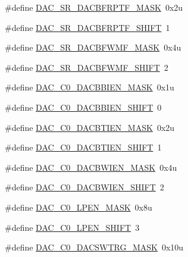 \begin{DoxyCompactItemize}
\#define \hyperlink{group___d_a_c___register___masks_ga662e824677c1a7a94ddd36e90f3d37d5}{D\+A\+C\+\_\+\+S\+R\+\_\+\+D\+A\+C\+B\+F\+R\+P\+T\+F\+\_\+\+M\+A\+SK}~0x2u
\item 
\#define \hyperlink{group___d_a_c___register___masks_gad1df4286616f5369388e865f5f821ae9}{D\+A\+C\+\_\+\+S\+R\+\_\+\+D\+A\+C\+B\+F\+R\+P\+T\+F\+\_\+\+S\+H\+I\+FT}~1
\item 
\#define \hyperlink{group___d_a_c___register___masks_ga612ec408d340d5011ff4326eda077ae3}{D\+A\+C\+\_\+\+S\+R\+\_\+\+D\+A\+C\+B\+F\+W\+M\+F\+\_\+\+M\+A\+SK}~0x4u
\item 
\#define \hyperlink{group___d_a_c___register___masks_ga01791b2f636fa97d33fa49d410ca8b44}{D\+A\+C\+\_\+\+S\+R\+\_\+\+D\+A\+C\+B\+F\+W\+M\+F\+\_\+\+S\+H\+I\+FT}~2
\item 
\#define \hyperlink{group___d_a_c___register___masks_gadc37ad99d42f4b9d0e26ce03f2ac79ad}{D\+A\+C\+\_\+\+C0\+\_\+\+D\+A\+C\+B\+B\+I\+E\+N\+\_\+\+M\+A\+SK}~0x1u
\item 
\#define \hyperlink{group___d_a_c___register___masks_ga956aa991114a1bb71a891e66d7092d1e}{D\+A\+C\+\_\+\+C0\+\_\+\+D\+A\+C\+B\+B\+I\+E\+N\+\_\+\+S\+H\+I\+FT}~0
\item 
\#define \hyperlink{group___d_a_c___register___masks_gad8a60a2fa6211ff08bba4b9648fb8daa}{D\+A\+C\+\_\+\+C0\+\_\+\+D\+A\+C\+B\+T\+I\+E\+N\+\_\+\+M\+A\+SK}~0x2u
\item 
\#define \hyperlink{group___d_a_c___register___masks_ga1f8eb9a96341365badba1280bed49e05}{D\+A\+C\+\_\+\+C0\+\_\+\+D\+A\+C\+B\+T\+I\+E\+N\+\_\+\+S\+H\+I\+FT}~1
\item 
\#define \hyperlink{group___d_a_c___register___masks_gaedff72359a12b93e4b61a57a0613d3cb}{D\+A\+C\+\_\+\+C0\+\_\+\+D\+A\+C\+B\+W\+I\+E\+N\+\_\+\+M\+A\+SK}~0x4u
\item 
\#define \hyperlink{group___d_a_c___register___masks_ga2b61f6fc85e9dc9d7c736055b47fadd1}{D\+A\+C\+\_\+\+C0\+\_\+\+D\+A\+C\+B\+W\+I\+E\+N\+\_\+\+S\+H\+I\+FT}~2
\item 
\#define \hyperlink{group___d_a_c___register___masks_ga54a04b9ae84c5a4f8977ae2e1a889717}{D\+A\+C\+\_\+\+C0\+\_\+\+L\+P\+E\+N\+\_\+\+M\+A\+SK}~0x8u
\item 
\#define \hyperlink{group___d_a_c___register___masks_ga97aaa812a3938df3559cb40b893db431}{D\+A\+C\+\_\+\+C0\+\_\+\+L\+P\+E\+N\+\_\+\+S\+H\+I\+FT}~3
\item 
\#define \hyperlink{group___d_a_c___register___masks_ga7e785d90fec3c1817fc53fea41f41644}{D\+A\+C\+\_\+\+C0\+\_\+\+D\+A\+C\+S\+W\+T\+R\+G\+\_\+\+M\+A\+SK}~0x10u

\end{DoxyCompactItemize}
